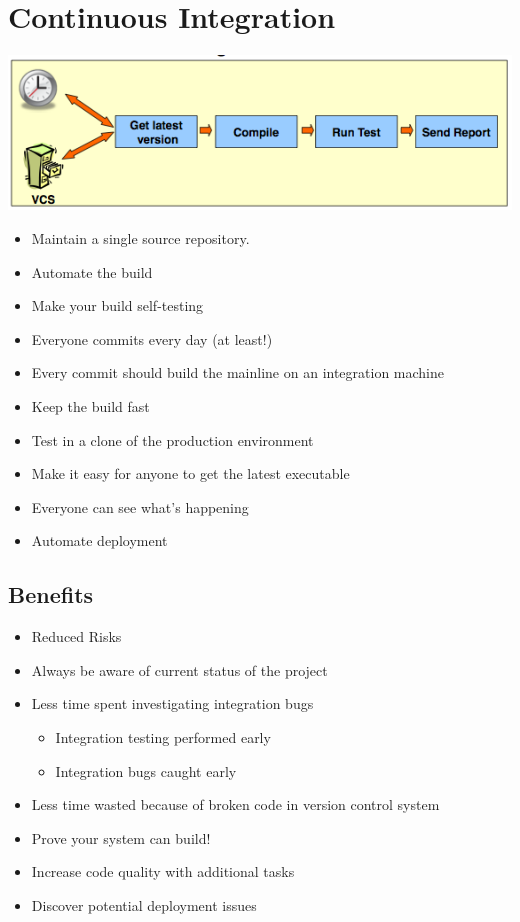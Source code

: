 \documentclass[a4paper,10pt]{article}
\begin{document}
\newpage
\section{Continuous Integration}
\includegraphics[scale=0.8]{continuous_integration.png}
\begin{itemize}
	\item Maintain a single source repository.
	\item Automate the build
	\item Make your build self-testing
	\item Everyone commits every day (at least!)
	\item Every commit should build the mainline on an integration machine
	\item Keep the build fast
	\item Test in a clone of the production environment	
	\item Make it easy for anyone to get the latest executable
	\item Everyone can see what's happening
	\item Automate deployment
\end{itemize}

\subsection{Benefits}
\begin{itemize}
	\item Reduced Risks
	\item Always be aware of current status of the project
	\item Less time spent investigating integration bugs
		\begin{itemize}
			\item Integration testing performed early
			\item Integration bugs caught early
		\end{itemize}
	\item Less time wasted because of broken code in version control system
	\item Prove your system can build!
	\item Increase code quality with additional tasks
	\item Discover potential deployment issues
\end{itemize}
\end{document}
